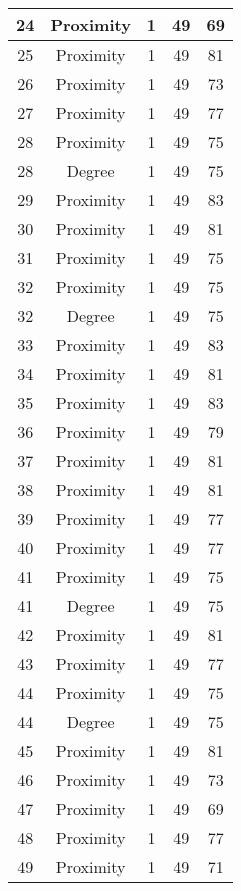 \documentclass[results.tex]{subfiles}
\begin{document}
\begin{center}
\begin{tabular}{| c || c | c | c | c |}
    \hline
    24 & Proximity & 1 & 49 & 69 \\ 
    \hline
    25 & Proximity & 1 & 49 & 81 \\ 
    \hline
    26 & Proximity & 1 & 49 & 73 \\ 
    \hline
    27 & Proximity & 1 & 49 & 77 \\ 
    \hline
    28 & Proximity & 1 & 49 & 75 \\ 
    \hline
    28 & Degree & 1 & 49 & 75 \\ 
    \hline
    29 & Proximity & 1 & 49 & 83 \\ 
    \hline
    30 & Proximity & 1 & 49 & 81 \\ 
    \hline
    31 & Proximity & 1 & 49 & 75 \\ 
    \hline
    32 & Proximity & 1 & 49 & 75 \\ 
    \hline
    32 & Degree & 1 & 49 & 75 \\ 
    \hline
    33 & Proximity & 1 & 49 & 83 \\ 
    \hline
    34 & Proximity & 1 & 49 & 81 \\ 
    \hline
    35 & Proximity & 1 & 49 & 83 \\ 
    \hline
    36 & Proximity & 1 & 49 & 79 \\ 
    \hline
    37 & Proximity & 1 & 49 & 81 \\ 
    \hline
    38 & Proximity & 1 & 49 & 81 \\ 
    \hline
    39 & Proximity & 1 & 49 & 77 \\ 
    \hline
    40 & Proximity & 1 & 49 & 77 \\ 
    \hline
    41 & Proximity & 1 & 49 & 75 \\ 
    \hline
    41 & Degree & 1 & 49 & 75 \\ 
    \hline
    42 & Proximity & 1 & 49 & 81 \\ 
    \hline
    43 & Proximity & 1 & 49 & 77 \\ 
    \hline
    44 & Proximity & 1 & 49 & 75 \\ 
    \hline
    44 & Degree & 1 & 49 & 75 \\ 
    \hline
    45 & Proximity & 1 & 49 & 81 \\ 
    \hline
    46 & Proximity & 1 & 49 & 73 \\ 
    \hline
    47 & Proximity & 1 & 49 & 69 \\ 
    \hline
    48 & Proximity & 1 & 49 & 77 \\ 
    \hline
    49 & Proximity & 1 & 49 & 71 \\ 
    \hline   \end{tabular}
\end{center}
\end{document}
